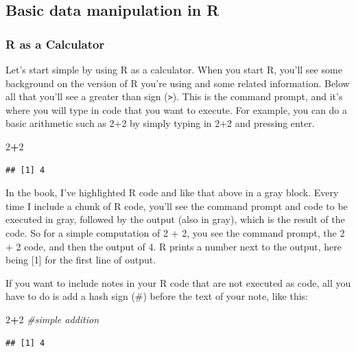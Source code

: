\documentclass[
]{book}
\newenvironment{Shaded}{\begin{snugshade}}{\end{snugshade}}
\newcommand{\CommentTok}[1]{\textcolor[rgb]{0.56,0.35,0.01}{\textit{#1}}}
\newcommand{\DecValTok}[1]{\textcolor[rgb]{0.00,0.00,0.81}{#1}}
\newcommand{\SpecialCharTok}[1]{\textcolor[rgb]{0.81,0.36,0.00}{\textbf{#1}}}
\begin{document}
\subsection{Basic data manipulation in R}\label{basic-data-manipulation-in-r}

\subsubsection{R as a Calculator}\label{r-as-a-calculator}

Let's start simple by using R as a calculator. When you start R, you'll see some background on the version of R you're using and some related information. Below all that you'll see a greater than sign (\texttt{\textgreater{}}). This is the command prompt, and it's where you will type in code that you want to execute. For example, you can do a basic arithmetic such as 2+2 by simply typing in 2+2 and pressing enter.

\begin{Shaded}
\begin{Highlighting}[]
\DecValTok{2}\SpecialCharTok{+}\DecValTok{2}
\end{Highlighting}
\end{Shaded}

\begin{verbatim}
## [1] 4
\end{verbatim}

In the book, I've highlighted R code and like that above in a gray block. Every time I include a chunk of R code, you'll see the command prompt and code to be executed in gray, followed by the output (also in gray), which is the result of the code. So for a simple computation of 2 + 2, you see the command prompt, the 2 + 2 code, and then the output of 4. R prints a number next to the output, here being {[}1{]} for the first line of output.

If you want to include notes in your R code that are not executed as code, all you have to do is add a hash sign (\#) before the text of your note, like this:

\begin{Shaded}
\begin{Highlighting}[]
\DecValTok{2}\SpecialCharTok{+}\DecValTok{2} \CommentTok{\#simple addition}
\end{Highlighting}
\end{Shaded}

\begin{verbatim}
## [1] 4
\end{verbatim}
\end{document}
